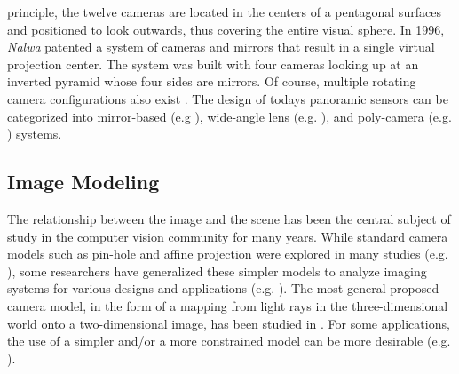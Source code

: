 principle, the twelve cameras are located in the centers of a pentagonal surfaces and positioned to
look outwards, thus covering the entire visual sphere. In 1996, \emph{Nalwa} patented a system of
cameras and mirrors that result in a single virtual projection center. The system was built with
four cameras looking up at an inverted pyramid whose four sides are mirrors. Of course, multiple
rotating camera configurations also exist \cite{ben98,ben96,mur95}. The design of todays panoramic
sensors can be categorized into mirror-based (e.g \cite{pri01,swa01,tan02,yok98}), wide-angle lens
(e.g. \cite{gro01,zhu00,zhu99}), and poly-camera (e.g. \cite{bak01,fer00,gro01,mcc97,nal98,ple03})
systems.

\subsection{Image Modeling}
The relationship between the image and the scene has been the central subject of study in the
computer vision community for many years. While standard camera models such as pin-hole and affine
projection were explored in many studies (e.g. \cite{har00}), some researchers have generalized
these simpler models to analyze imaging systems for various designs and applications (e.g.
\cite{gro01,nay97-1,sch01,sei01,swa00}). The most general proposed camera model, in the form of a
mapping from light rays in the three-dimensional world onto a two-dimensional image, has been
studied in \cite{gro01,rad98}. For some applications, the use of a simpler and/or a more
constrained model can be more desirable (e.g. \cite{gup97,pel00}).







